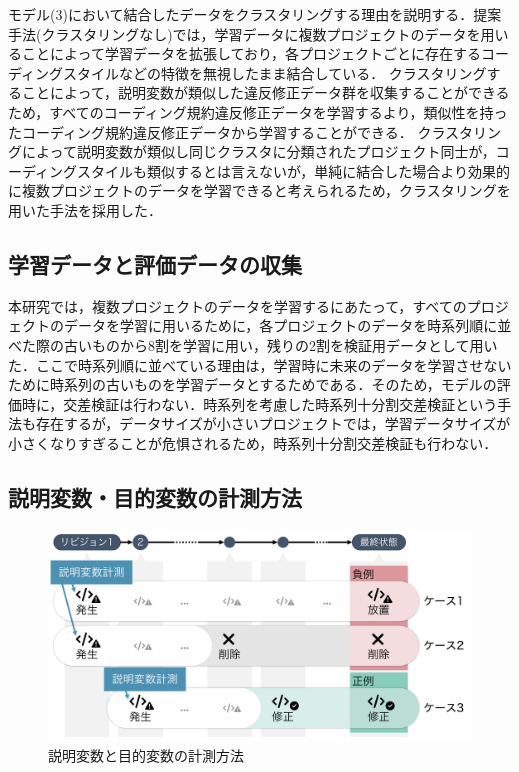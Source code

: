 \documentclass[submit,noauthor,ses,dvipdfmx]{ipsj}
\begin{document}
モデル(3)において結合したデータをクラスタリングする理由を説明する．提案手法(クラスタリングなし)では，学習データに複数プロジェクトのデータを用いることによって学習データを拡張しており，各プロジェクトごとに存在するコーディングスタイルなどの特徴を無視したまま結合している．
クラスタリングすることによって，説明変数が類似した違反修正データ群を収集することができるため，すべてのコーディング規約違反修正データを学習するより，類似性を持ったコーディング規約違反修正データから学習することができる．
クラスタリングによって説明変数が類似し同じクラスタに分類されたプロジェクト同士が，コーディングスタイルも類似するとは言えないが，単純に結合した場合より効果的に複数プロジェクトのデータを学習できると考えられるため，クラスタリングを用いた手法を採用した．



\subsection{学習データと評価データの収集}

本研究では，複数プロジェクトのデータを学習するにあたって，すべてのプロジェクトのデータを学習に用いるために，各プロジェクトのデータを時系列順に並べた際の古いものから8割を学習に用い，残りの2割を検証用データとして用いた．ここで時系列順に並べている理由は，学習時に未来のデータを学習させないために時系列の古いものを学習データとするためである．そのため，モデルの評価時に，交差検証は行わない．時系列を考慮した時系列十分割交差検証という手法も存在するが，データサイズが小さいプロジェクトでは，学習データサイズが小さくなりすぎることが危惧されるため，時系列十分割交差検証も行わない．



\subsection{説明変数・目的変数の計測方法}


\begin{figure}[t]
	\centering
	\includegraphics[width=1.0\linewidth]{Kameoka_fig/kameoka_fig2.pdf}
	\caption{説明変数と目的変数の計測方法}
	\label{fig:mokutekihensu}
\end{figure}
\end{document}
